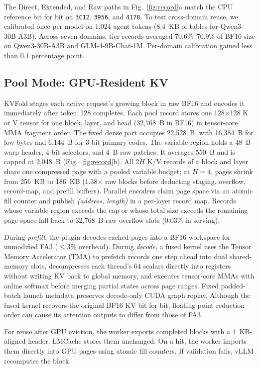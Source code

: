 \documentclass[conference]{IEEEtran}
\begin{document}
The Direct, Extended, and Raw paths in Fig.~\ref{fig:record}a match the CPU
reference bit for bit on \texttt{3C12}, \texttt{3956}, and \texttt{4178}.
To test cross-domain reuse, we calibrated once per model on 1,024 agent tokens
(8.4~KB of tables for Qwen3-30B-A3B). Across seven domains, tier records
averaged 70.6\%--70.9\% of BF16 size on Qwen3-30B-A3B and GLM-4-9B-Chat-1M.
Per-domain calibration gained less than 0.1 percentage point.

\subsection{Pool Mode: GPU-Resident KV}
\label{sec:pool}
KVFold stages each active request's growing block in raw BF16 and encodes it
immediately after token~128 completes. Each pool record
stores one 128$\times$128 K or V tensor for one block, layer, and head
(32,768~B in BF16) in tensor-core MMA fragment order. The fixed dense part
occupies 22,528~B, with 16,384~B for low bytes and 6,144~B for 3-bit primary
codes. The variable region holds a 48~B warp header, 4-bit selectors, and
4~B raw patches. It averages 550~B and is capped at 2,048~B
(Fig.~\ref{fig:record}b). All $2H$ K/V records of a block and layer share one
compressed page with a pooled variable budget; at $H{=}4$, pages shrink from
256~KB to 186~KB (1.38$\times$ raw blocks before deducting staging, overflow,
record-map, and prefill buffers). Parallel encoders claim page space via an
atomic fill counter and publish \emph{(address, length)} in a per-layer record
map. Records whose variable region exceeds the cap or whose total size exceeds
the remaining page space fall back to 32,768~B raw overflow slots (0.03\% in
serving).

During \emph{prefill}, the plugin decodes cached pages into a BF16 workspace
for unmodified FA3 ($\le$3\% overhead). During \emph{decode}, a fused kernel
uses the Tensor Memory Accelerator (TMA) to prefetch records one step ahead
into dual shared-memory slots, decompresses each thread's 64 scalars directly
into registers without writing KV back to global memory, and executes
tensor-core MMAs with online softmax before merging partial states across page
ranges. Fixed padded-batch launch metadata preserves decode-only CUDA graph
replay. Although the fused kernel recovers the original BF16 KV bit for bit,
floating-point reduction order can cause its attention outputs to differ from
those of FA3.

For reuse after GPU eviction, the worker exports completed blocks with a
4~KB-aligned header. LMCache stores them unchanged. On a hit, the worker
imports them directly into GPU pages using atomic fill counters. If validation
fails, vLLM recomputes the block.
\end{document}
